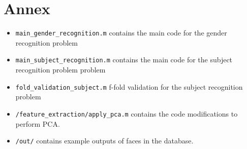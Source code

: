 \section{Annex}
\label{sec:ann}

\begin{itemize}
	\item \texttt{main\_gender\_recognition.m} contains the main code for the gender recognition problem
	\item \texttt{main\_subject\_recognition.m} contains the main code for the subject recognition problem problem
	\item \texttt{fold\_validation\_subject.m} f-fold validation for the subject recognition problem
	\item \texttt{/feature\_extraction/apply\_pca.m} contains the code modifications to perform PCA.
	\item \texttt{/out/} contains example outputs of faces in the database.
\end{itemize}
